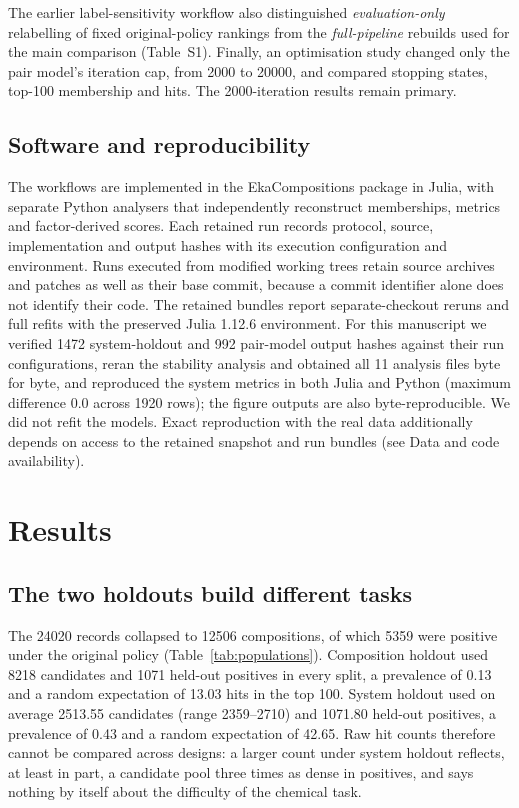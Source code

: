 \documentclass[11pt,a4paper]{article}
\begin{document}
The earlier label-sensitivity workflow also distinguished \emph{evaluation-only} relabelling of fixed original-policy rankings from the \emph{full-pipeline} rebuilds used for the main comparison (Table~S1). Finally, an optimisation study changed only the pair model's iteration cap, from \num{2000} to \num{20000}, and compared stopping states, top-100 membership and hits. The \num{2000}-iteration results remain primary.

\subsection{Software and reproducibility}
The workflows are implemented in the EkaCompositions package in Julia, with separate Python analysers that independently reconstruct memberships, metrics and factor-derived scores. Each retained run records protocol, source, implementation and output hashes with its execution configuration and environment. Runs executed from modified working trees retain source archives and patches as well as their base commit, because a commit identifier alone does not identify their code. The retained bundles report separate-checkout reruns and full refits with the preserved Julia 1.12.6 environment. For this manuscript we verified \num{1472} system-holdout and 992 pair-model output hashes against their run configurations, reran the stability analysis and obtained all 11 analysis files byte for byte, and reproduced the system metrics in both Julia and Python (maximum difference 0.0 across \num{1920} rows); the figure outputs are also byte-reproducible. We did not refit the models. Exact reproduction with the real data additionally depends on access to the retained snapshot and run bundles (see Data and code availability).

\section{Results}

\subsection{The two holdouts build different tasks}
The \num{24020} records collapsed to \num{12506} compositions, of which \num{5359} were positive under the original policy (Table~\ref{tab:populations}). Composition holdout used \num{8218} candidates and \num{1071} held-out positives in every split, a prevalence of 0.13 and a random expectation of 13.03 hits in the top 100. System holdout used on average \num{2513.55} candidates (range \num{2359}--\num{2710}) and \num{1071.80} held-out positives, a prevalence of 0.43 and a random expectation of 42.65. Raw hit counts therefore cannot be compared across designs: a larger count under system holdout reflects, at least in part, a candidate pool three times as dense in positives, and says nothing by itself about the difficulty of the chemical task.
\end{document}

